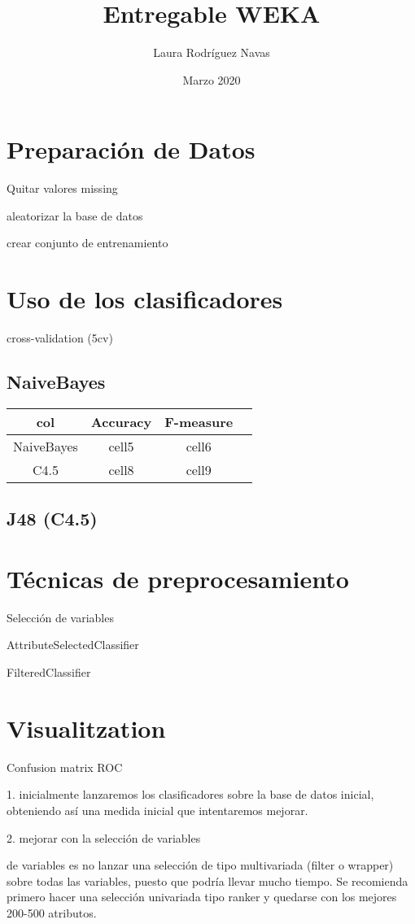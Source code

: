 \documentclass{article}
\title{Entregable WEKA}
\author{Laura Rodríguez Navas}
\date{Marzo 2020}
\begin{document}
\maketitle

\section*{Preparación de Datos}

Quitar valores missing

aleatorizar la base de datos

crear conjunto de entrenamiento

\section*{Uso de los clasificadores}

cross-validation (5cv)

\subsection*{NaiveBayes}

\begin{center}
	\begin{tabular}{ |c|c|c|c| } 
		\hline
		col & Accuracy & F-measure \\
		\hline
		NaiveBayes& cell5 & cell6 \\ 
		C4.5 & cell8 & cell9 \\ 
		\hline
	\end{tabular}
\end{center}

\subsection*{J48 (C4.5)}

\section*{Técnicas de preprocesamiento}

Selección de variables

AttributeSelectedClassifier

FilteredClassifier

\section*{Visualitzation}

Confusion matrix
ROC




1. inicialmente lanzaremos los clasificadores sobre la base de datos inicial, obteniendo así una medida inicial que intentaremos mejorar.

2. mejorar con la selección de variables

de variables es no lanzar una selección de tipo multivariada (filter o wrapper) sobre todas las variables, puesto que podría llevar mucho tiempo. Se recomienda primero hacer una selección univariada tipo ranker y quedarse con los mejores 200-500 atributos.
\end{document}

